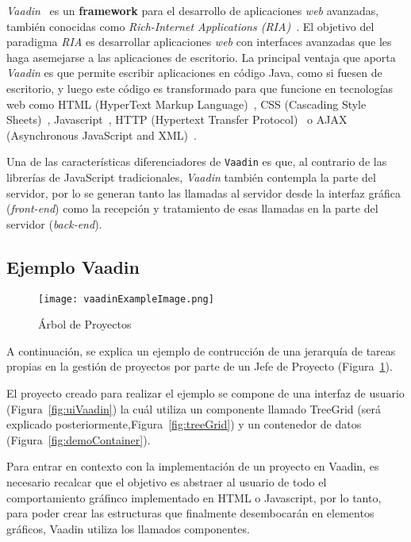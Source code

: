 

\emph{Vaadin}~\cite{vaadin} es un \textbf{framework} para el desarrollo de aplicaciones \emph{web} avanzadas, también conocidas como \emph{Rich-Internet Applications (RIA)}~\cite{ria}. El objetivo del paradigma \emph{RIA} es desarrollar aplicaciones \emph{web} con interfaces avanzadas que les haga asemejarse a las aplicaciones de escritorio. La principal ventaja que aporta \emph{Vaadin} es que permite escribir aplicaciones en código Java, como si fuesen de escritorio, y luego este código es transformado para que funcione en tecnologías web como HTML (HyperText Markup Language)~\cite{html}, CSS (Cascading Style Sheets)~\cite{css}, Javascript~\cite{javascript}, HTTP (Hypertext Transfer Protocol)~\cite{http} o AJAX (Asynchronous JavaScript and XML)~\cite{ajax}.

Una de las características diferenciadores de \texttt{Vaadin} es que, al contrario de las librerías de JavaScript tradicionales, \emph{Vaadin} también contempla la parte del servidor, por lo se generan tanto las llamadas al servidor desde la interfaz gráfica (\emph{front-end}) como la recepción y tratamiento de esas llamadas en la parte del servidor (\emph{back-end}).



 	
 \subsection{Ejemplo Vaadin}
 	
\begin{figure}[!tb]
	\centering
	\texttt{[image: vaadinExampleImage.png]}
	\caption{Árbol de Proyectos}
	\label{fig:vaadinExampleImage}
\end{figure}

A continuación, se explica un ejemplo de contrucción de una jerarquía de tareas propias en la gestión de proyectos por parte de un Jefe de Proyecto (Figura~\ref{fig:vaadinExampleImage}).

El proyecto creado para realizar el ejemplo se compone de una interfaz de usuario (Figura~\ref{fig:uiVaadin}) la cuál utiliza un componente llamado TreeGrid  (será explicado posteriormente,Figura~\ref{fig:treeGrid}) y un contenedor de datos (Figura~\ref{fig:demoContainer}).

Para entrar en contexto con la implementación de un proyecto en Vaadin, es necesario recalcar que el objetivo es abstraer al usuario de todo el comportamiento gráfinco implementado en HTML o Javascript, por lo tanto, para poder crear las estructuras que finalmente desembocarán en elementos gráficos, Vaadin utiliza los llamados componentes.

